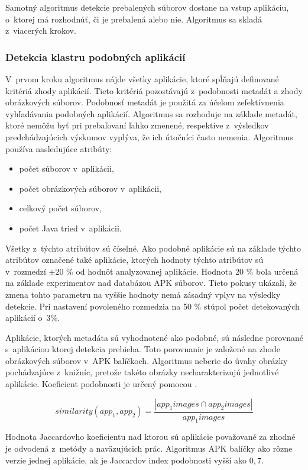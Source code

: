 Samotný algoritmus detekcie prebalených súborov dostane na vstup aplikáciu, o~ktorej má rozhodnúť, či je prebalená alebo nie. Algoritmus sa skladá z~viacerých krokov.

\subsubsection{\textbf{Detekcia klastru podobných aplikácií}} 

V~prvom kroku algoritmus nájde všetky aplikácie, ktoré spĺňajú definované kritériá zhody aplikácií. Tieto kritériá pozostávajú z~podobnosti metadát a zhody obrázkových súborov. 
Podobnosť metadát je použitá za účelom zefektívnenia vyhľadávania podobných aplikácií. Algoritmus sa rozhoduje na základe metadát, ktoré nemôžu byť pri prebaľovaní ľahko zmenené, respektíve z~výsledkov predchádzajúcich výskumov vyplýva, že ich útočníci často nemenia. \newline \noindent Algoritmus používa nasledujúce atribúty:
\begin{itemize}
	\item počet  súborov v~aplikácii,
	\item počet obrázkových súborov v~aplikácii,
	\item celkový počet súborov,
	\item počet Java tried v~aplikácii.
\end{itemize}

Všetky z~týchto atribútov sú číselné. Ako podobné aplikácie sú na základe týchto atribútov označené také aplikácie, ktorých hodnoty týchto atribútov sú v~rozmedzí $\pm 20$ \% od hodnôt analyzovanej aplikácie. Hodnota 20 \% bola určená na základe experimentov nad databázou APK súborov. Tieto pokusy ukázali, že zmena tohto parametru na vyššie hodnoty nemá zásadný vplyv na výsledky detekcie. Pri nastavení povoleného rozmedzia na 50 \% stúpol počet detekovaných aplikácií o~3\%.

Aplikácie, ktorých metadáta sú vyhodnotené ako podobné, sú následne porovnané s~aplikáciou ktorej detekcia prebieha. Toto porovnanie je založené na zhode obrázkových súborov v~APK balíčkoch. Algoritmus neberie do úvahy obrázky pochádzajúce z~knižníc, pretože takéto obrázky necharakterizujú jednotlivé aplikácie.  Koeficient podobnosti je určený pomocou .

\[ similarity(app_1, app_2) = \frac{|app_{1}images \cap app_{2}images|} { app_{1}images} \]

Hodnota Jaccardovho koeficientu nad ktorou sú aplikácie považované za zhodné je odvodená z~metódy  a naväzujúcich prác. Algoritmus APK balíčky ako rôzne verzie jednej aplikácie, ak je Jaccardov index podobnosti vyšší ako $0,7$.

